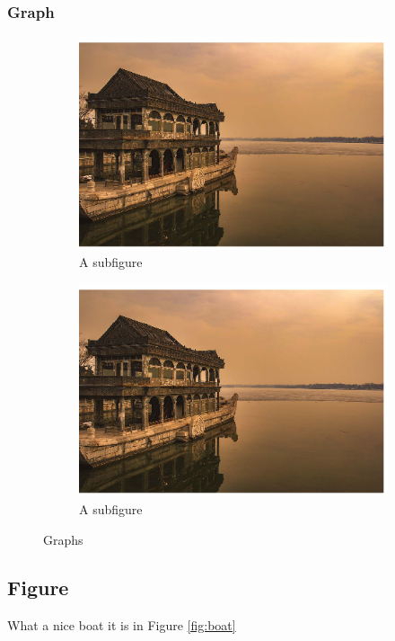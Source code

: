 \documentclass[conference]{sig-alternate}
\begin{document}
\subsubsection{Graph}
\begin{figure}[h!]
	\centering
	\begin{subfigure}{.25\textwidth}
		\includegraphics[width=.9\linewidth]{boat.jpg}
		\caption{A subfigure}
		\label{fig:sub1}
	\end{subfigure}%
	\begin{subfigure}{.25\textwidth}
		\includegraphics[width=.9\textwidth]{boat.jpg}
		\caption{A subfigure}
		\label{fig:sub2}
	\end{subfigure}
	\caption{Graphs}
	\label{fig:test}
\end{figure}
\subsection{Figure}
What a nice boat it is in Figure \ref{fig:boat}
\end{document}
